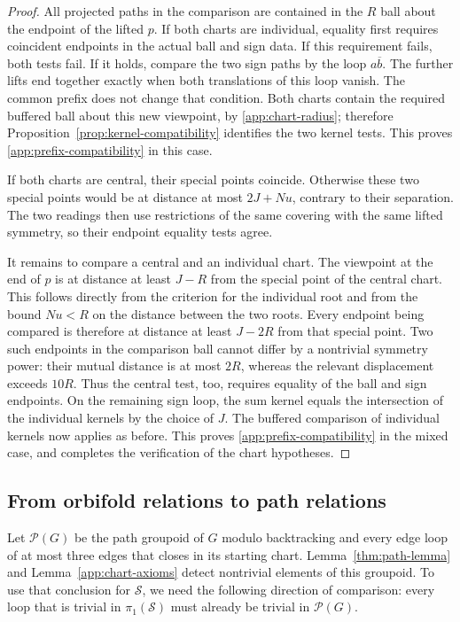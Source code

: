 \documentclass[11pt,reqno]{amsart}
\numberwithin{equation}{section}
\theoremstyle{definition}
\theoremstyle{remark}
\newcommand{\cS}{\mathcal S}
\begin{document}
\begin{proof}
All projected paths in the comparison are contained in the $R$ ball
about the endpoint of the lifted $p$.  If both charts are individual,
equality first requires coincident endpoints in the actual ball and
sign data.  If this requirement fails, both tests fail.  If it holds,
compare the two sign paths by the loop $a\overline b$.  The further
lifts end together exactly when both translations of this loop
vanish.  The common prefix does not change that condition.  Both
charts contain the required buffered ball about this new viewpoint,
by \eqref{app:chart-radius}; therefore
Proposition~\ref{prop:kernel-compatibility} identifies the two kernel
tests.  This proves \eqref{app:prefix-compatibility} in this case.

If both charts are central, their special points coincide.  Otherwise
these two special points would be at distance at most $2J+Nu$,
contrary to their separation.  The two readings then use restrictions
of the same covering with the same lifted symmetry, so their endpoint
equality tests agree.

It remains to compare a central and an individual chart.  The
viewpoint at the end of $p$ is at distance at least $J-R$ from the
special point of the central chart.  This follows directly from the
criterion for the individual root and from the bound $Nu<R$ on the
distance between the two roots.  Every endpoint being compared is
therefore at distance at least $J-2R$ from that special point.  Two
such endpoints in the comparison ball cannot differ by a nontrivial
symmetry power: their mutual distance is at most $2R$, whereas the
relevant displacement exceeds $10R$.  Thus the central test, too,
requires equality of the ball and sign endpoints.  On the remaining
sign loop, the sum kernel equals the intersection of the individual
kernels by the choice of $J$.  The buffered comparison of individual
kernels now applies as before.  This proves
\eqref{app:prefix-compatibility} in the mixed case, and completes the
verification of the chart hypotheses.
\end{proof}

\subsection{From orbifold relations to path relations}

Let $\mathcal P(G)$ be the path groupoid of $G$ modulo backtracking
and every edge loop of at most three edges that closes in its starting
chart.  Lemma~\ref{thm:path-lemma} and
Lemma~\ref{app:chart-axioms} detect nontrivial elements of this
groupoid.  To use that conclusion for $\cS$, we need the following
direction of comparison: every loop that is trivial in
$\pi_1(\cS)$ must already be trivial in $\mathcal P(G)$.
\end{document}

